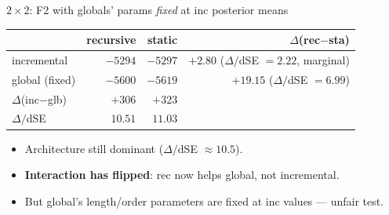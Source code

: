 \documentclass[10pt,aspectratio=169]{beamer}
\newcommand{\emp}[1]{\textcolor{CSP-emphasis}{\textbf{#1}}}
\newcommand{\muted}[1]{\textcolor{CSP-text-light}{#1}}
\begin{document}
\begin{frame}{$2\!\times\!2$: F2 with globals' params \emph{fixed} at inc posterior means}
\begin{center}
\begin{tabular}{l|rr|r}
\toprule
              & recursive & static & $\Delta$(rec$-$sta) \\
\midrule
incremental   & $-5294$ & $-5297$ & $+2.80$ ($\Delta/$dSE $= 2.22$, marginal) \\
global (fixed)& $-5600$ & $-5619$ & \emp{$+19.15$} ($\Delta/$dSE $= 6.99$) \\
\midrule
$\Delta$(inc$-$glb) & $+306$ & $+323$ & \\
$\Delta/$dSE        & $10.51$ & $11.03$ & \\
\bottomrule
\end{tabular}
\end{center}

\vspace{0.8em}
\begin{itemize}\itemsep0.2em
  \item Architecture still dominant ($\Delta/$dSE $\approx 10.5$).
  \item \emp{Interaction has flipped}: rec now helps global, not incremental.
  \item But global's length/order parameters are \muted{fixed at inc values} --- unfair test.
\end{itemize}
\end{frame}
\end{document}
